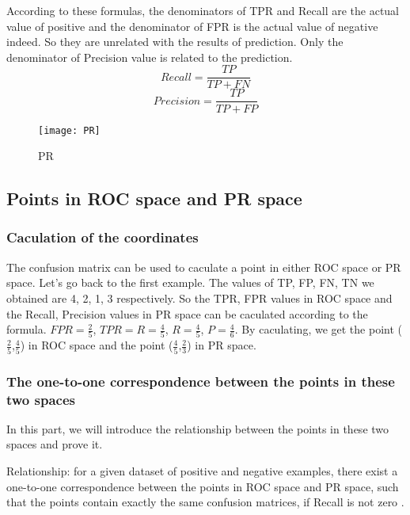 \documentclass[a4paper,12pt]{article}
\begin{document}
According to these formulas, the denominators of TPR and Recall are the actual value of positive and the denominator of FPR is the actual value of negative indeed. So they are unrelated with the results of prediction. Only the denominator of Precision value is related to the prediction.
\begin{equation}\label{eq:Recall}
Recall=\frac{TP}{TP+FN}
\end{equation}
\begin{equation}\label{eq:Precision}
Precision=\frac{TP}{TP+FP}
\end{equation}

\begin{figure}[!ht]
\centering\texttt{[image: PR]}
\caption{PR}\label{PR:1}
\end{figure} 

\subsection{Points in ROC space and PR space}

\subsubsection{Caculation of the coordinates}
The confusion matrix can be used to caculate a point in either ROC space or PR space. Let's go back to the first example. The values of TP, FP, FN, TN we obtained are 4, 2, 1, 3 respectively. So the TPR, FPR values in ROC space and the Recall, Precision values in PR space can be caculated according to the formula. $FPR=\frac{2}{5}$, $TPR=R=\frac{4}{5}$, $R=\frac{4}{5}$, $P=\frac{4}{6}$. By caculating, we get the point ($\frac{2}{5}$,$\frac{4}{5}$) in ROC space and the point ($\frac{4}{5}$,$\frac{2}{3}$) in PR space.

\subsubsection{The one-to-one correspondence between the points in these two spaces}
In this part, we will introduce the relationship between the points in these two spaces and prove it.

Relationship: for a given dataset of positive and negative examples, there exist a one-to-one correspondence between the points in ROC space and PR space, such that the points contain exactly the same confusion matrices, if Recall is not zero \cite{3:article}.
\end{document}
